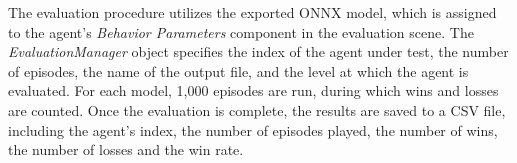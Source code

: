 The evaluation procedure utilizes the exported ONNX model, which is assigned to the agent’s \textit{Behavior Parameters} component in the evaluation scene. The \textit{EvaluationManager} object specifies the index of the agent under test, the number of episodes, the name of the output file, and the level at which the agent is evaluated. For each model, 1,000 episodes are run, during which wins and losses are counted. Once the evaluation is complete, the results are saved to a CSV file, including the agent’s index, the number of episodes played, the number of wins, the number of losses and the win rate.


























